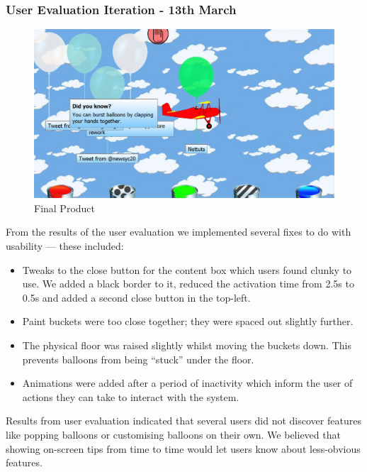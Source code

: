 \subsubsection{User Evaluation Iteration - 13th March}
\begin{figure}[h]
\begin{centering}
\includegraphics[width=\textwidth]{Diagrams/Client-Log-W10.jpg}
\par\end{centering}

\caption{Final Product}
\label{ScreenFinal}
\end{figure}
From the results of the user evaluation we implemented several fixes to do with
usability --- these included:
\begin{itemize}
\item{Tweaks to the close button for the content box which users found clunky 
to use. We added a black border to it, reduced the activation time from 2.5s to
0.5s and added a second close button in the top-left.}
\item{Paint buckets were too close together; they were spaced out slightly 
further.}
\item{The physical floor was raised slightly whilst moving the buckets down. 
This prevents balloons from being ``stuck'' under the floor.}
\item{Animations were added after a period of inactivity which inform the user
of actions they can take to interact with the system.}
\end{itemize}

Results from user evaluation indicated that several users did not discover 
features like popping balloons or customising balloons on their own. We believed 
that showing on-screen tips from time to time would let users know about 
less-obvious features. 

